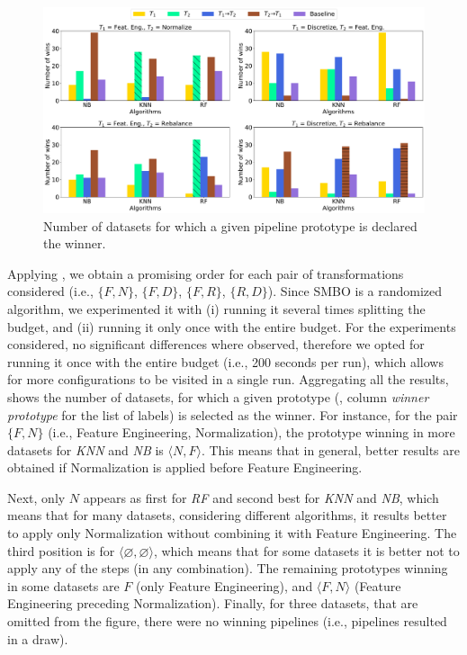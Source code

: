 \begin{example}
\begin{figure}[!b]
	\centering
	\includegraphics[width=1.0\textwidth]{chapters/data-centric/supervised/img/experiments_results.pdf}
	\caption{Number of datasets for which a given pipeline prototype is declared the winner.}
	\label{fig:learned-rules-results}
\end{figure}

Applying , we obtain a promising order for each pair of transformations considered (i.e., $\{F,N\}$, $\{F,D\}$, $\{F,R\}$, $\{R,D\}$).
Since SMBO is a randomized algorithm, we experimented it with (i) running it several times splitting the budget, and (ii) running it only once with the entire budget.
For the experiments considered, no significant differences where observed, therefore we opted for running it once with the entire budget (i.e., 200 seconds per run), which allows for more configurations to be visited in a single run. Aggregating all the results,  shows the number of datasets, for which a given prototype (, column \textit{winner prototype} for the list of labels) is selected as the winner.
For instance, for the pair $\{F,N\}$ (i.e., Feature Engineering, Normalization), the prototype winning in more datasets for \textit{KNN} and \textit{NB} is $\langle N, F \rangle$.
This means that in general, better results are obtained if Normalization is applied before Feature Engineering.

Next, only $N$ appears as first for \textit{RF} and second best for \textit{KNN} and \textit{NB}, which means that for many datasets, considering different algorithms, it results better to apply only Normalization without combining it with Feature Engineering.
The third position is for $\langle \varnothing, \varnothing \rangle$, which means that for some datasets it is better not to apply any of the steps (in any combination).
The remaining prototypes winning in some datasets are $F$ (only Feature Engineering), and $\langle F, N \rangle$ (Feature Engineering preceding Normalization).
Finally, for three datasets, that are omitted from the figure, there were no winning pipelines (i.e., pipelines resulted in a draw).


\end{example}
